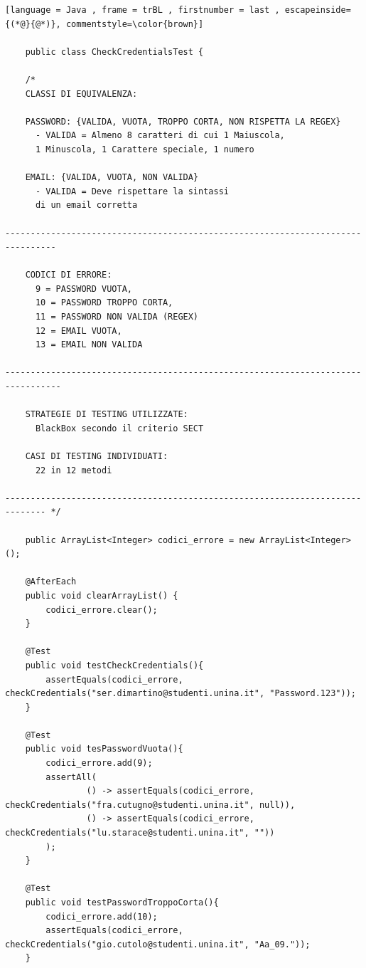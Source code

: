 \vspace{0.2cm}

\begin{lstlisting}[language = Java , frame = trBL , firstnumber = last , escapeinside={(*@}{@*)}, commentstyle=\color{brown}]

    public class CheckCredentialsTest {

    /*
    CLASSI DI EQUIVALENZA:
   
    PASSWORD: {VALIDA, VUOTA, TROPPO CORTA, NON RISPETTA LA REGEX}
      - VALIDA = Almeno 8 caratteri di cui 1 Maiuscola,
      1 Minuscola, 1 Carattere speciale, 1 numero

    EMAIL: {VALIDA, VUOTA, NON VALIDA}
      - VALIDA = Deve rispettare la sintassi
      di un email corretta

--------------------------------------------------------------------------------

    CODICI DI ERRORE:
      9 = PASSWORD VUOTA,
      10 = PASSWORD TROPPO CORTA,
      11 = PASSWORD NON VALIDA (REGEX)
      12 = EMAIL VUOTA, 
      13 = EMAIL NON VALIDA

---------------------------------------------------------------------------------

    STRATEGIE DI TESTING UTILIZZATE: 
      BlackBox secondo il criterio SECT

    CASI DI TESTING INDIVIDUATI: 
      22 in 12 metodi

------------------------------------------------------------------------------ */

    public ArrayList<Integer> codici_errore = new ArrayList<Integer>();

    @AfterEach
    public void clearArrayList() {
        codici_errore.clear();
    }

    @Test
    public void testCheckCredentials(){
        assertEquals(codici_errore, checkCredentials("ser.dimartino@studenti.unina.it", "Password.123"));
    }

    @Test
    public void tesPasswordVuota(){
        codici_errore.add(9);
        assertAll(
                () -> assertEquals(codici_errore, checkCredentials("fra.cutugno@studenti.unina.it", null)),
                () -> assertEquals(codici_errore, checkCredentials("lu.starace@studenti.unina.it", ""))
        );
    }

    @Test
    public void testPasswordTroppoCorta(){
        codici_errore.add(10);
        assertEquals(codici_errore, checkCredentials("gio.cutolo@studenti.unina.it", "Aa_09."));
    }


\end{lstlisting}
